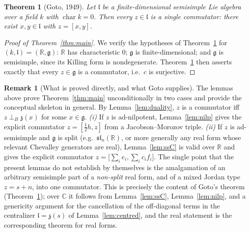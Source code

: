 \documentclass{amsart}
\newtheorem{theorem}{Theorem}
\theoremstyle{definition}
\newtheorem{remark}{Remark}
\begin{document}
\begin{theorem}[Goto, 1949]\label{thm:goto}
Let $\mathfrak l$ be a finite-dimensional semisimple Lie algebra over a field
$k$ with $\operatorname{char}k=0$. Then every $z\in\mathfrak l$ is a single
commutator: there exist $x,y\in\mathfrak l$ with $z=[x,y]$.
\end{theorem}

\begin{proof}[Proof of Theorem~\ref{thm:main}]
We verify the hypotheses of Theorem~\ref{thm:goto} for
$(k,\mathfrak l)=(\mathbb R,\mathfrak g)$: $\mathbb R$ has characteristic $0$;
$\mathfrak g$ is finite-dimensional; and $\mathfrak g$ is semisimple, since its
Killing form is nondegenerate. Theorem~\ref{thm:goto} then asserts exactly that
every $z\in\mathfrak g$ is a commutator, i.e.\ $c$ is surjective.
\end{proof}

\begin{remark}[What is proved directly, and what Goto supplies]
The lemmas above prove Theorem~\ref{thm:main} unconditionally in two cases and
provide the conceptual skeleton in general. By Lemma~\ref{lem:duality}, $z$ is a
commutator iff $z\perp_{B}\mathfrak z(x)$ for some $x\in\mathfrak g$.
\emph{(i)} If $z$ is ad-nilpotent, Lemma~\ref{lem:nilp} gives the explicit
commutator $z=[\tfrac12 h,z]$ from a Jacobson--Morozov triple.
\emph{(ii)} If $z$ is ad-semisimple and $\mathfrak g$ is split (e.g.\
$\mathfrak{sl}_n(\mathbb R)$, or more generally any real form whose relevant
Chevalley generators are real), Lemma~\ref{lem:ssC} is valid over $\mathbb R$ and
gives the explicit commutator $z=\bigl[\sum_i e_i,\sum_i c_i f_i\bigr]$.
The single point that the present lemmas do not establish by themselves is the
amalgamation of an arbitrary semisimple part of a \emph{non-split} real form, and
of a mixed Jordan type $z=s+n$, into one commutator. This is precisely the
content of Goto's theorem (Theorem~\ref{thm:goto}); over $\mathbb C$ it follows
from Lemma~\ref{lem:ssC}, Lemma~\ref{lem:nilp}, and a genericity argument for the
cancellation of the off-diagonal terms in the centralizer
$\mathfrak l=\mathfrak z(s)$ of Lemma~\ref{lem:centred}, and the real statement
is the corresponding theorem for real forms.
\end{remark}
\end{document}
